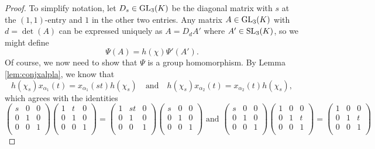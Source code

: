 \begin{proof}
    To simplify notation, let $D_s\in\GL_3(K)$ be the diagonal matrix with $s$ at the $(1,1)$-entry and $1$ in the other two entries. Any matrix $A\in\GL_3(K)$ with $d=\det(A)$ can be expressed uniquely as $A=D_dA'$ where $A'\in\SL_3(K)$, so we might define 
    $$\Psi(A)=h(\chi)\Psi'(A').$$
    Of course, we now need to show that $\Psi$ is a group homomorphism. By Lemma \ref{lem:conjxalpla}, we know that 
    $$h(\chi_s)x_{\alpha_1}(t)=x_{\alpha_1}(st)h(\chi_s)\quad\text{and}\quad h(\chi_s)x_{\alpha_2}(t)=x_{\alpha_2}(t)h(\chi_s),$$
    which agrees with the identities
    $$\begin{pmatrix}
        s & 0 & 0\\
        0 & 1 & 0\\
        0 & 0 & 1\\
    \end{pmatrix}\begin{pmatrix}
        1 & t & 0\\
        0 & 1 & 0\\
        0 & 0 & 1\\
    \end{pmatrix}=\begin{pmatrix}
        1 & st & 0\\
        0 & 1 & 0\\
        0 & 0 & 1\\
    \end{pmatrix}\begin{pmatrix}
        s & 0 & 0\\
        0 & 1 & 0\\
        0 & 0 & 1\\
    \end{pmatrix}\text{ and }\begin{pmatrix}
        s & 0 & 0\\
        0 & 1 & 0\\
        0 & 0 & 1\\
    \end{pmatrix}\begin{pmatrix}
        1 & 0 & 0\\
        0 & 1 & t\\
        0 & 0 & 1\\
    \end{pmatrix}=\begin{pmatrix}
        1 & 0 & 0\\
        0 & 1 & t\\
        0 & 0 & 1\\

\end{pmatrix}$$
\end{proof}
